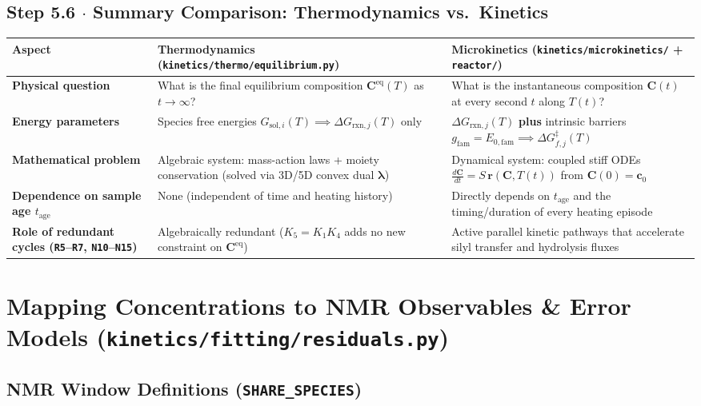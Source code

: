 \documentclass[11pt,a4paper]{article}
\let\origsection\section
\renewcommand{\section}{\clearpage\origsection}
\begin{document}
\subsection*{Step 5.6 $\cdot$ Summary Comparison: Thermodynamics vs.\ Kinetics}

\begin{tabularx}{\textwidth}{L{3.8cm} Y Y}
\toprule
\textbf{Aspect} & \textbf{Thermodynamics (\texttt{kinetics/\allowbreak{}thermo/\allowbreak{}equilibrium.py})} & \textbf{Microkinetics (\texttt{kinetics/\allowbreak{}microkinetics/\allowbreak{}} + \texttt{reactor/\allowbreak{}})} \\
\midrule
\textbf{Physical question} & What is the final equilibrium composition $\mathbf{C}^{\text{eq}}(T)$ as $t \to \infty$? & What is the instantaneous composition $\mathbf{C}(t)$ at every second $t$ along $T(t)$? \\[4pt]
\textbf{Energy parameters} & Species free energies $G_{\text{sol}, i}(T) \implies \Delta G_{\text{rxn}, j}(T)$ only & $\Delta G_{\text{rxn}, j}(T)$ \textbf{plus} intrinsic barriers $g_{\text{fam}} = E_{0,\text{fam}} \implies \Delta G_{f,j}^\ddagger(T)$ \\[4pt]
\textbf{Mathematical problem} & Algebraic system: mass-action laws + moiety conservation (solved via 3D/5D convex dual $\bm{\lambda}$) & Dynamical system: coupled stiff ODEs $\frac{d\mathbf{C}}{dt} = S\,\mathbf{r}(\mathbf{C}, T(t))$ from $\mathbf{C}(0) = \mathbf{c}_0$ \\[4pt]
\textbf{Dependence on sample age $t_{\text{age}}$} & None (independent of time and heating history) & Directly depends on $t_{\text{age}}$ and the timing/duration of every heating episode \\[4pt]
\textbf{Role of redundant cycles (\texttt{R5}--\texttt{R7}, \texttt{N10}--\texttt{N15})} & Algebraically redundant ($K_5 = K_1 K_4$ adds no new constraint on $\mathbf{C}^{\text{eq}}$) & Active parallel kinetic pathways that accelerate silyl transfer and hydrolysis fluxes \\
\bottomrule
\end{tabularx}


\section{Mapping Concentrations to NMR Observables \& Error Models (\texttt{kinetics/\allowbreak{}fitting/\allowbreak{}residuals.py})}

\subsection{NMR Window Definitions (\texttt{SHARE\_\allowbreak{}SPECIES})}
\end{document}
